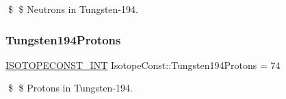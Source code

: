 \$ \$ Neutrons in Tungsten-\/194. \mbox{\label{group___isotope_const-_tungsten-_w194_gaf6a24f42f8315baa739fb7c6bb3ebe3e}} 
\subsubsection{\texorpdfstring{Tungsten194\+Protons}{Tungsten194Protons}}
{\footnotesize\ttfamily \mbox{\hyperlink{group___isotope_const-_macros_ga5f18360b3e99483a35c32d789e62621c}{I\+S\+O\+T\+O\+P\+E\+C\+O\+N\+S\+T\+\_\+\+I\+NT}} Isotope\+Const\+::\+Tungsten194\+Protons = 74}

\$ \$ Protons in Tungsten-\/194. 